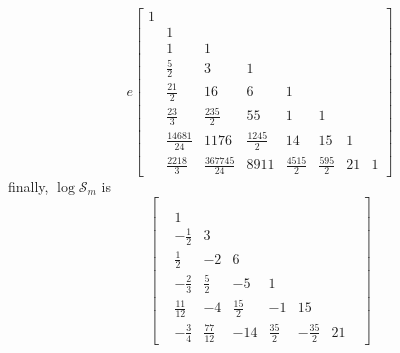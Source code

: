 \begin{displaymath}
e \left[\begin{matrix}1 &   &   &   &   &   &   &  \\  & 1 &   &   &   &   &   &  \\  & 1 & 1 &   &   &   &   &  \\  & \frac{5}{2} & 3 & 1 &   &   &   &  \\  & \frac{21}{2} & 16 & 6 & 1 &   &   &  \\  & \frac{2 3}{3} & \frac{235}{2} & 55 & 1  & 1 &   &  \\  & \frac{14681}{24} & 1176 & \frac{1245}{2} & 14  & 15 & 1 &  \\  & \frac{22 18}{3} & \frac{367745}{24} & 8911 & \frac{4515}{2} & \frac{595}{2} & 21 & 1\end{matrix}\right]
\end{displaymath}
finally, $\log{\mathcal{S}_{m}}$ is
\begin{displaymath}
\left[\begin{matrix}  &   &   &   &   &   &   &  \\  &   &   &   &   &   &   &  \\  & 1 &   &   &   &   &   &  \\  & - \frac{1}{2} & 3 &   &   &   &   &  \\  & \frac{1}{2} & -2 & 6 &   &   &   &  \\  & - \frac{2}{3} & \frac{5}{2} & -5 & 1  &   &   &  \\  & \frac{11}{12} & -4 & \frac{15}{2} & -1  & 15 &   &  \\  & - \frac{3}{4} & \frac{77}{12} & -14 & \frac{35}{2} & - \frac{35}{2} & 21 &  \end{matrix}\right]
\end{displaymath}
